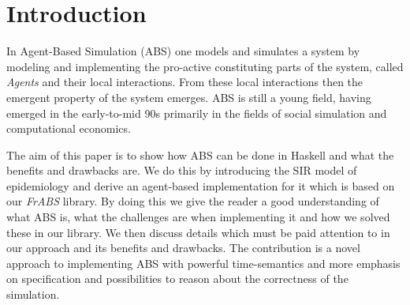 \section{Introduction}

In Agent-Based Simulation (ABS) one models and simulates a system by modeling and implementing the pro-active constituting parts of the system, called \textit{Agents} and their local interactions. From these local interactions then the emergent property of the system emerges. ABS is still a young field, having emerged in the early-to-mid 90s primarily in the fields of social simulation and computational economics. 

The aim of this paper is to show how ABS can be done in Haskell and what the benefits and drawbacks are. We do this by introducing the SIR model of epidemiology and derive an agent-based implementation for it which is based on our \textit{FrABS} library. By doing this we give the reader a good understanding of what ABS is, what the challenges are when implementing it and how we solved these in our library. We then discuss details which must be paid attention to in our approach and its benefits and drawbacks. The contribution is a novel approach to implementing ABS with powerful time-semantics and more emphasis on specification and possibilities to reason about the correctness of the simulation.